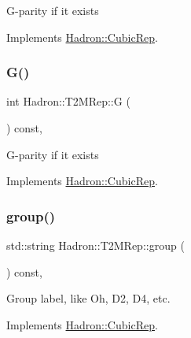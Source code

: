 G-\/parity if it exists 

Implements \mbox{\hyperlink{structHadron_1_1CubicRep_a52104e43266d1614c00bbd1c3b395458}{Hadron\+::\+Cubic\+Rep}}.

\mbox{\label{structHadron_1_1T2MRep_a1876c1f6b93ff7a6d230f1c8f9678506}} 
\subsubsection{\texorpdfstring{G()}{G()}\hspace{0.1cm}{\footnotesize\ttfamily [3/3]}}
{\footnotesize\ttfamily int Hadron\+::\+T2\+M\+Rep\+::G (\begin{DoxyParamCaption}{ }\end{DoxyParamCaption}) const\hspace{0.3cm}{\ttfamily [inline]}, {\ttfamily [virtual]}}

G-\/parity if it exists 

Implements \mbox{\hyperlink{structHadron_1_1CubicRep_a52104e43266d1614c00bbd1c3b395458}{Hadron\+::\+Cubic\+Rep}}.

\mbox{\label{structHadron_1_1T2MRep_a1326313751ae23194da5dcb326ac44a1}} 
\subsubsection{\texorpdfstring{group()}{group()}\hspace{0.1cm}{\footnotesize\ttfamily [1/3]}}
{\footnotesize\ttfamily std\+::string Hadron\+::\+T2\+M\+Rep\+::group (\begin{DoxyParamCaption}{ }\end{DoxyParamCaption}) const\hspace{0.3cm}{\ttfamily [inline]}, {\ttfamily [virtual]}}

Group label, like Oh, D2, D4, etc. 

Implements \mbox{\hyperlink{structHadron_1_1CubicRep_a0748f11ec87f387062c8e8981339a29c}{Hadron\+::\+Cubic\+Rep}}.

\mbox{\label{structHadron_1_1T2MRep_a1326313751ae23194da5dcb326ac44a1}} 
